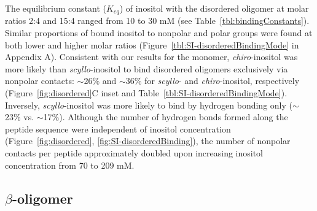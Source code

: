 The equilibrium constant ($K_{eq}$) of inositol with the disordered oligomer at molar ratios 2:4 and 15:4 ranged from 10 to 30 mM (see Table~\ref{tbl:bindingConstants}).
Similar proportions of bound inositol to nonpolar and polar groups were found at both lower and higher molar ratios (Figure~{\ref{tbl:SI-disorderedBindingMode}} in Appendix A). 
Consistent with our results for the monomer, \emph{chiro}-inositol was more likely than \emph{scyllo}-inositol to bind disordered oligomers exclusively via nonpolar contacts: $\sim$26\% and $\sim$36\% for \emph{scyllo}- and \emph{chiro}-inositol, respectively (Figure~\ref{fig:disordered}C inset and Table~\ref{tbl:SI-disorderedBindingMode}).  
Inversely, \emph{scyllo}-inositol was more likely to bind by hydrogen bonding only ($\sim$23\% vs. $\sim$17\%). Although the number of hydrogen bonds formed along the peptide sequence were independent of inositol concentration (Figure~\ref{fig:disordered}, \ref{fig:SI-disorderedBinding}), the number of nonpolar contacts per peptide approximately doubled upon increasing inositol concentration from 70 to 209 mM.

\subsection{$\beta$-oligomer}

